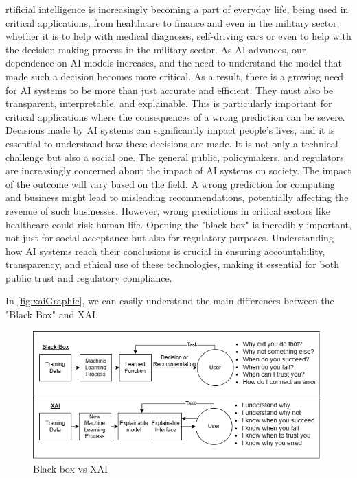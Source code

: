 \documentclass[10pt,journal,compsoc]{IEEEtran}
\begin{document}
rtificial intelligence is increasingly becoming a part of everyday life, being used in critical applications, from healthcare to finance and even in the military sector, 
whether it is to help with medical diagnoses, self-driving cars or even to help with the decision-making process in the military sector.
As AI advances, our dependence on AI models increases, and the need to understand the model that made such a decision becomes more critical.
As a result, there is a growing need for AI systems to be more than just accurate and efficient. They must also be transparent, interpretable, and explainable. 
This is particularly important for critical applications where the consequences of a wrong prediction can be severe. \cite{transparency}
Decisions made by AI systems can significantly impact people's lives, and it is essential to understand how these decisions are made.\cite{analytical-review} 
It is not only a technical challenge but also a social one. The general public, policymakers, and regulators are increasingly concerned about the impact of AI systems on society. \cite{doshivelez2017rigorous}
The impact of the outcome will vary based on the field. A wrong prediction for computing and business might lead to misleading recommendations, potentially affecting the revenue of such businesses. 
However, wrong predictions in critical sectors like healthcare could risk human life. Opening the "black box" is incredibly important, not just for social acceptance but also for regulatory purposes. 
Understanding how AI systems reach their conclusions is crucial in ensuring accountability, transparency, and ethical use of these technologies, making it essential for both public trust and regulatory compliance.\cite{analytical-review}


In \autoref{fig:xaiGraphic}, we can easily understand the main differences between the "Black Box" and XAI.\cite{xai-concept}

\begin{figure}[h]
    \centering
    \includegraphics[scale=0.37]{images/xaiGraphic.png}
    \caption{Black box vs XAI}
    \label{fig:xaiGraphic}
\end{figure}
\end{document}
